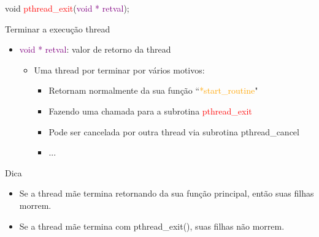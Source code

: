 \documentclass[10pt, xcolor=x11names]{beamer}
\begin{document}
\begin{frame}

void \textcolor{red}{pthread\_exit}(\textcolor{purple}{void * retval});

	\begin{block}{Terminar a execução thread}
		\begin{itemize}
			\item \textcolor{purple}{void * retval}: valor de retorno da thread
				\begin{itemize}
					\item Uma thread por terminar por vários motivos:
						\begin{itemize}
							\item Retornam normalmente da sua função ``\textcolor{orange}{*start\_routine}"
							\item Fazendo uma chamada para a subrotina \textcolor{red}{pthread\_exit}
							\item Pode ser cancelada por outra thread via subrotina pthread\_cancel
							\item ...
						\end{itemize}
					
				\end{itemize}
		\end{itemize}
	\end{block}

	\begin{alertblock}{Dica}
		\begin{itemize}
			\item Se a thread mãe termina retornando da sua função principal, então suas filhas morrem.
			\item Se a thread mãe termina com pthread\_exit(), suas filhas não morrem.
		\end{itemize}
	\end{alertblock}

\end{frame}

\end{document}
